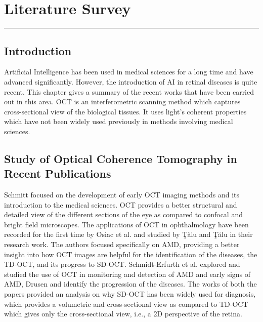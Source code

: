 \chapter{Literature Survey}
\label{chapter:literature} 
\noindent\rule{\linewidth}{2pt}

\section{Introduction}
Artificial Intelligence has been used in medical sciences for a long time and have advanced significantly. However, the introduction of AI in retinal diseases is quite recent. This chapter gives a summary of the recent works that have been carried out in this area. OCT is an interferometric scanning method which captures cross-sectional view of the biological tissues. It uses light’s coherent properties which have not been widely used previously in methods involving medical sciences.

\section{Study of Optical Coherence Tomography in Recent Publications}
Schmitt \cite{Schmitt} focused on the development of early OCT imaging methods and its introduction to the medical sciences. OCT provides a better structural and detailed view of the different sections of the eye as compared to confocal and bright field microscopes. The applications of OCT in ophthalmology have been recorded for the first time by Osiac et al. \cite{Osiac2011} and studied by Ţălu and Ţălu\cite{simonaDelia} in their research work. The authors focused specifically on AMD, providing a better insight into how OCT images are helpful for the identification of the diseases, the TD-OCT, and its progress to SD-OCT. Schmidt-Erfurth et al. \cite{Schmidt2017} explored and studied the use of OCT in monitoring and detection of AMD and early signs of AMD, Drusen and identify the progression of the diseases. The works of both the papers provided an analysis on why SD-OCT has been widely used for diagnosis, which provides a volumetric and cross-sectional view as compared to TD-OCT which gives only the cross-sectional view, i.e., a 2D perspective of the retina.

